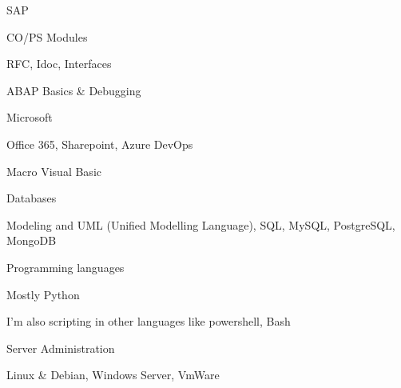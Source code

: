 

\begin{cventries}
	
	\zcventry
	{SAP} %
	{
		\begin{cvitems} %
			\item {CO/PS Modules}
			\item {RFC, Idoc, Interfaces}
			\item {ABAP Basics \& Debugging}
		\end{cvitems}
	}
	
	\zcventry
	{Microsoft} %
	{
		\begin{cvitems} %
			\item {Office 365, Sharepoint, Azure DevOps}
			\item {Macro Visual Basic}
		\end{cvitems}
	}
	
	\zcventry
	{Databases} %
	{
		\begin{cvitems} %
			\item {Modeling and UML (Unified Modelling Language), SQL, MySQL, PostgreSQL, MongoDB}
		\end{cvitems}
	}
	
	\zcventry
	{Programming languages} %
	{
		\begin{cvitems} %
			\item {Mostly Python}
			\item {I'm also scripting in other languages like powershell, Bash}
		\end{cvitems}
	}
	
	\zcventry
	{Server Administration} %
	{
		\begin{cvitems} %
			\item {Linux \& Debian, Windows Server, VmWare}
		\end{cvitems}
	}
	

\end{cventries}
